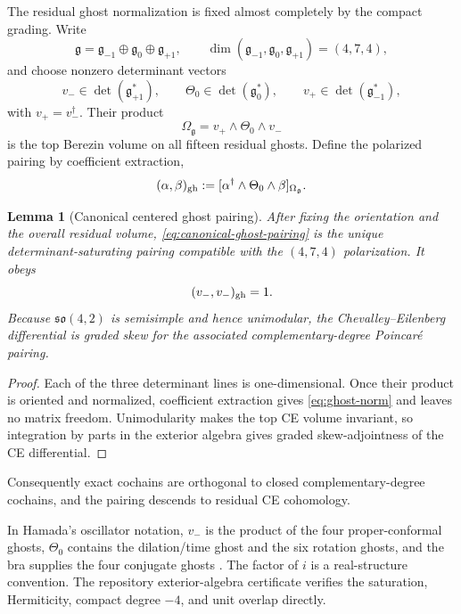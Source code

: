 \documentclass[11pt]{article}
\newtheorem{lemma}[theorem]{Lemma}
\theoremstyle{definition}
\theoremstyle{remark}
\newcommand{\g}{\mathfrak g}
\begin{document}
The residual ghost normalization is fixed almost completely by the compact
grading.  Write
\begin{equation}
 \g=\g_{-1}\oplus\g_0\oplus\g_{+1},
 \qquad \dim(\g_{-1},\g_0,\g_{+1})=(4,7,4),
\end{equation}
and choose nonzero determinant vectors
\begin{equation}
 v_-\in\det(\g_{+1}^*),
 \qquad
 \Theta_0\in\det(\g_0^*),
 \qquad
 v_+\in\det(\g_{-1}^*),
\end{equation}
with $v_+=v_-^\dagger$.  Their product
\begin{equation}
 \Omega_\g=v_+\wedge\Theta_0\wedge v_-
\end{equation}
is the top Berezin volume on all fifteen residual ghosts.  Define the
polarized pairing by coefficient extraction,
\begin{equation}\label{eq:canonical-ghost-pairing}
 (\alpha,\beta)_{\rm gh}
 :=[\alpha^\dagger\wedge\Theta_0\wedge\beta]_{\Omega_\g}.
\end{equation}

\begin{lemma}[Canonical centered ghost pairing]\label{lem:ghost-pairing}
After fixing the orientation and the overall residual volume,
\eqref{eq:canonical-ghost-pairing} is the unique determinant-saturating
pairing compatible with the $(4,7,4)$ polarization.  It obeys
\begin{equation}\label{eq:ghost-norm}
 (v_-,v_-)_{\rm gh}=1.
\end{equation}
Because $\mathfrak{so}(4,2)$ is semisimple and hence unimodular, the
Chevalley--Eilenberg differential is graded skew for the associated
complementary-degree Poincar\'e pairing.
\end{lemma}

\begin{proof}
Each of the three determinant lines is one-dimensional.  Once their product
is oriented and normalized, coefficient extraction gives
\eqref{eq:ghost-norm} and leaves no matrix freedom.  Unimodularity makes the
top CE volume invariant, so integration by parts in the exterior algebra
gives graded skew-adjointness of the CE differential.
\end{proof}

Consequently exact cochains are orthogonal to closed complementary-degree
cochains, and the pairing descends to residual CE cohomology.

In Hamada's oscillator notation, $v_-$ is the product of the four
proper-conformal ghosts, $\Theta_0$ contains the dilation/time ghost and the
six rotation ghosts, and the bra supplies the four conjugate ghosts
\cite{HamadaBRST}.  The factor of $i$ is a real-structure convention.  The
repository exterior-algebra certificate verifies the saturation,
Hermiticity, compact degree $-4$, and unit overlap directly.
\end{document}
